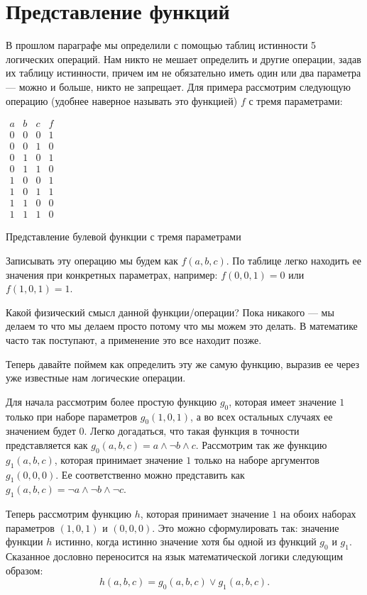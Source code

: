 \section{Представление функций}

В прошлом параграфе мы определили с помощью таблиц истинности 5 логических операций. Нам никто не мешает определить и другие операции, задав их таблицу истинности, причем им не обязательно иметь один или два параметра — можно и больше, никто не запрещает. Для примера рассмотрим следующую операцию (удобнее наверное называть это функцией) $f$ с тремя параметрами:
\begin{table}[h]
\centering
$\begin{array}{ccc|c}a&b&c&f\\ \hline 0&0&0&1\\0&0&1&0\\0&1&0&1\\0&1&1&0\\1&0&0&1\\1&0&1&1\\1&1&0&0\\1&1&1&0\end{array}$
\caption{Представление булевой функции с тремя параметрами}
\end{table}

Записывать эту операцию мы будем как $f(a, b, c)$. По таблице легко находить ее значения при конкретных параметрах, например: $f(0,0,1) = 0$ или $f(1,0,1) = 1$.

Какой физический смысл данной функции/операции? Пока никакого — мы делаем то что мы делаем просто потому что мы можем это делать. В математике часто так поступают, а применение это все находит позже.

Теперь давайте поймем как определить эту же самую функцию, выразив ее через уже известные нам логические операции.

Для начала рассмотрим более простую функцию $g_0$, которая имеет значение $1$ только при наборе параметров $g_0(1, 0, 1)$, а во всех остальных случаях ее значением будет $0$. Легко догадаться, что такая функция в точности представляется как $g_0(a, b, c) = a\wedge \neg b \wedge c$. Рассмотрим так же функцию $g_1(a, b, c)$, которая принимает значение $1$ только на наборе аргументов $g_1(0, 0, 0)$. Ее соответственно можно представить как $g_1(a, b, c) = \neg a \wedge \neg b \wedge \neg c$.

Теперь рассмотрим функцию $h$, которая принимает значение $1$ на обоих наборах параметров $(1, 0, 1)$ и $(0, 0, 0)$. Это можно сформулировать так:   значение функции $h$ истинно, когда истинно значение хотя бы одной из функций $g_0$ и $g_1$. Сказанное дословно переносится на язык математической логики следующим образом:
$$h(a, b, c) = g_0(a, b, c) \vee g_1(a, b, c).$$


